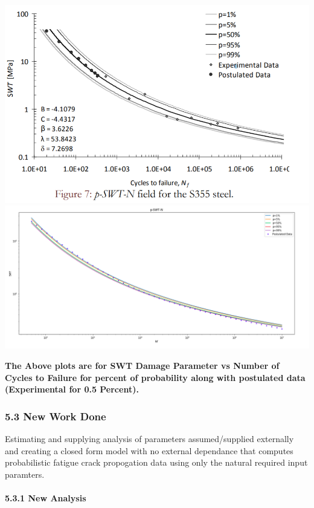 \documentclass[11pt]{article}
\begin{document}
\includegraphics{images/p_s_n_paper.PNG}
\includegraphics{images/p_s_n_model.PNG}

\textbf{The Above plots are for SWT Damage Parameter vs Number of Cycles
to Failure for percent of probability along with postulated data
(Experimental for 0.5 Percent).}

\hypertarget{new-work-done}{%
\subsubsection{5.3 New Work Done}\label{new-work-done}}

Estimating and supplying analysis of parameters assumed/supplied
externally and creating a closed form model with no external dependance
that computes probabilistic fatigue crack propogation data using only
the natural required input paramters.

\hypertarget{new-analysis}{%
\paragraph{5.3.1 New Analysis}\label{new-analysis}}
\end{document}
